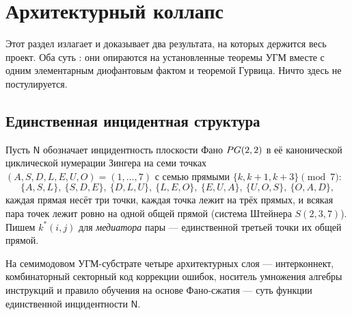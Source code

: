 \section{Архитектурный коллапс}
\label{sec:collapse}

Этот раздел излагает и доказывает два результата, на которых держится весь
проект. Оба суть : они опираются на установленные теоремы УГМ вместе
с одним элементарным диофантовым фактом и теоремой Гурвица. Ничто здесь не
постулируется.

\subsection{Единственная инцидентная структура}

Пусть $\mathsf{N}$ обозначает инцидентность плоскости Фано $PG(2,2)$ в её
канонической циклической нумерации Зингера на семи точках
$(A,S,D,L,E,U,O)=(1,\dots,7)$ с семью прямыми $\{k,k{+}1,k{+}3\}\pmod 7$:
\[
\{A,S,L\},\ \{S,D,E\},\ \{D,L,U\},\ \{L,E,O\},\ \{E,U,A\},\ \{U,O,S\},\ \{O,A,D\},
\]
каждая прямая несёт три точки, каждая точка лежит на трёх прямых, и всякая пара
точек лежит ровно на одной общей прямой (система Штейнера $S(2,3,7)$). Пишем
$k^\ast(i,j)$ для \emph{медиатора} пары --- единственной третьей точки их общей
прямой.

\begin{theorembox}
На семимодовом УГМ-субстрате четыре архитектурных слоя --- интерконнект,
комбинаторный секторный код коррекции ошибок, носитель умножения алгебры
инструкций и правило обучения на основе Фано-сжатия --- суть функции
единственной инцидентности $\mathsf{N}$.
\end{theorembox}

